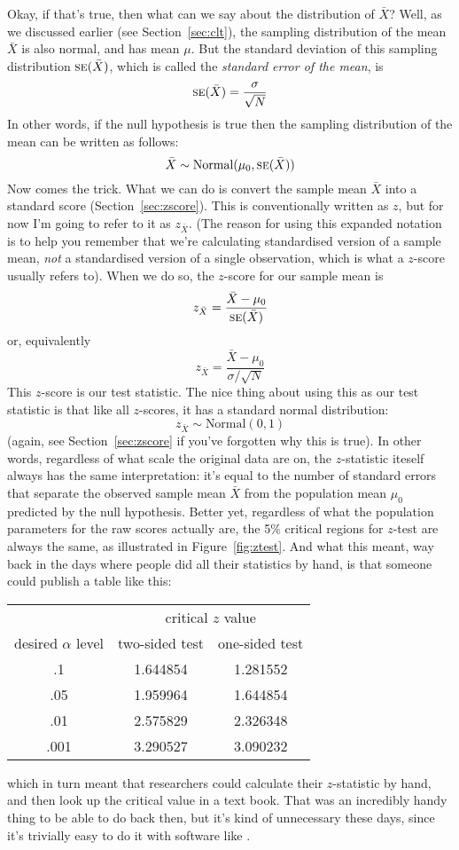 \noindent
Okay, if that's true, then what can we say about the distribution of $\bar{X}$? Well, as we discussed earlier (see Section~\ref{sec:clt}), the sampling distribution of the mean $\bar{X}$ is also normal, and has mean $\mu$. But the standard deviation of this sampling distribution $\mbox{\textsc{se}}(\bar{X})$, which is called the {\it standard error of the mean}, is
$$
\mbox{\textsc{se}}(\bar{X}) = \frac{\sigma}{\sqrt{N}}
$$
In other words, if the null hypothesis is true then the sampling distribution of the mean can be written as follows:
$$
\bar{X} \sim \mbox{Normal}(\mu_0,\mbox{\textsc{se}}(\bar{X}))
$$
Now comes the trick. What we can do is convert the sample mean $\bar{X}$ into a standard score (Section~\ref{sec:zscore}). This is conventionally written as $z$, but for now I'm going to refer to it as $z_{\bar{X}}$. (The reason for using this expanded notation is to help you remember that we're calculating standardised version of a sample mean, {\it not} a standardised version of a single observation, which is what a $z$-score usually refers to). When we do so, the $z$-score for our sample mean is 
$$
z_{\bar{X}} = \frac{\bar{X} - \mu_0}{\mbox{\textsc{se}}(\bar{X})}
$$
or, equivalently
$$
z_{\bar{X}} =  \frac{\bar{X} - \mu_0}{\sigma / \sqrt{N}}
$$
This $z$-score is our test statistic. The nice thing about using this as our test statistic is that like all $z$-scores, it has a standard normal distribution:
$$
z_{\bar{X}} \sim \mbox{Normal}(0,1)
$$
(again, see Section~\ref{sec:zscore} if you've forgotten why this is true). In other words, regardless of what scale the original data are on, the $z$-statistic iteself always has the same interpretation: it's equal to the number of standard errors that separate the observed sample mean $\bar{X}$ from the population mean $\mu_0$ predicted by the null hypothesis. Better yet, regardless of what the population parameters for the raw scores actually are, the 5\% critical regions for $z$-test are always the same, as illustrated in Figure~\ref{fig:ztest}. And what this meant, way back in the days where people did all their statistics by hand, is that someone could publish a table like this:
\begin{center}
\begin{tabular}{c|cc}
& \multicolumn{2}{|c}{critical $z$ value} \\
desired $\alpha$ level & two-sided test & one-sided test \\ \hline
.1  &  1.644854 & 1.281552 \\
.05 &  1.959964 & 1.644854 \\
.01 &  2.575829 & 2.326348 \\
.001&  3.290527 & 3.090232 \\
\end{tabular}
\end{center}
which in turn meant that researchers could calculate their $z$-statistic by hand, and then look up the critical value in a text book.  That was an incredibly handy thing to be able to do back then, but it's kind of unnecessary these days, since it's trivially easy to do it with software like \R.


